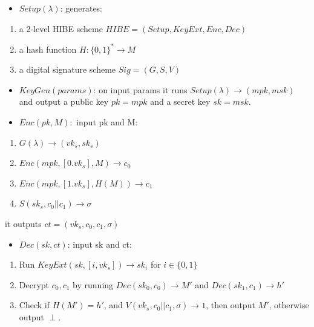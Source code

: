 \documentclass[
]{article}
\providecommand{\tightlist}{%
  \setlength{\itemsep}{0pt}\setlength{\parskip}{0pt}}
\begin{document}
\begin{itemize}
\tightlist
\item
  \(Setup(\lambda)\): generates:
\end{itemize}

\begin{enumerate}
\def\labelenumi{\arabic{enumi}.}
\item
  a 2-level HIBE scheme \(HIBE=(Setup, KeyExt,Enc, Dec)\)
\item
  a hash function \(H: \{0, 1\}^* \rightarrow M\)
\item
  a digital signature scheme \(Sig = (G, S, V)\)
\end{enumerate}

\begin{itemize}
\item
  \(KeyGen(params)\): on input params it runs
  \(Setup(\lambda)\rightarrow (mpk,msk)\) and output a public key
  \(pk = mpk\) and a secret key \(sk = msk\).
\item
  \(Enc(pk,M):\) input pk and M:
\end{itemize}

\begin{enumerate}
\def\labelenumi{\arabic{enumi}.}
\tightlist
\item
  \(G(\lambda)\rightarrow ({vk}_s, {sk}_s)\)
\item
  \(Enc(mpk, [0.{vk}_s],M)\rightarrow c_0\)
\item
  \(Enc(mpk, [1.{vk}_s],H(M))\rightarrow c_1\)
\item
  \(S({sk}_s, c_0||c_1)\rightarrow \sigma\)
\end{enumerate}

it outputs \(ct = ({vk}_s, c_0, c_1, \sigma)\)

\begin{itemize}
\tightlist
\item
  \(Dec(sk, ct)\): input sk and ct:
\end{itemize}

\begin{enumerate}
\def\labelenumi{\arabic{enumi}.}
\item
  Run \(KeyExt(sk,[i,{vk}_s])\rightarrow {sk}_i\) for \(i \in \{0, 1\}\)
\item
  Decrypt \(c_0,c_1\) by running \(Dec({sk}_0, c_0)\rightarrow M'\) and
  \(Dec({sk}_1, c_1)\rightarrow h'\)
\item
  Check if \(H(M') = h'\), and
  \(V({vk}_s, c_0||c_1, \sigma)\rightarrow 1\), then output \(M'\),
  otherwise output \(\perp\).
\end{enumerate}
\end{document}
